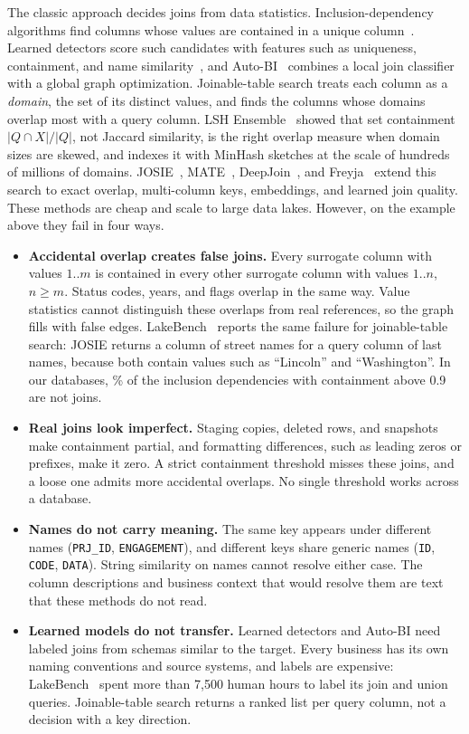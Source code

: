 The classic approach decides joins from data statistics.
Inclusion-dependency algorithms find columns whose values are contained in a unique column~\cite{Tschirschnitz17}.
Learned detectors score such candidates with features such as uniqueness, containment, and name similarity~\cite{Rostin09,ZhangHOPS10,HoPF}, and Auto-BI~\cite{AutoBI} combines a local join classifier with a global graph optimization.
Joinable-table search treats each column as a \emph{domain}, the set of its distinct values, and finds the columns whose domains overlap most with a query column.
LSH Ensemble~\cite{DBLP:journals/pvldb/ZhuNPM16} showed that set containment $|Q \cap X|/|Q|$, not Jaccard similarity, is the right overlap measure when domain sizes are skewed, and indexes it with MinHash sketches at the scale of hundreds of millions of domains.
JOSIE~\cite{DBLP:conf/sigmod/ZhuDNM19}, MATE~\cite{MATE}, DeepJoin~\cite{2023_dong_deepjoin}, and Freyja~\cite{Freyja} extend this search to exact overlap, multi-column keys, embeddings, and learned join quality.
These methods are cheap and scale to large data lakes.
However, on the example above they fail in four ways.
\begin{itemize}[leftmargin=*]
\item \textbf{Accidental overlap creates false joins.} Every surrogate column with values $1..m$ is contained in every other surrogate column with values $1..n$, $n \geq m$. Status codes, years, and flags overlap in the same way. Value statistics cannot distinguish these overlaps from real references, so the graph fills with false edges. LakeBench~\cite{LakeBench} reports the same failure for joinable-table search: JOSIE returns a column of street names for a query column of last names, because both contain values such as ``Lincoln'' and ``Washington''. In our databases, \% of the inclusion dependencies with containment above 0.9 are not joins.
\item \textbf{Real joins look imperfect.} Staging copies, deleted rows, and snapshots make containment partial, and formatting differences, such as leading zeros or prefixes, make it zero. A strict containment threshold misses these joins, and a loose one admits more accidental overlaps. No single threshold works across a database.
\item \textbf{Names do not carry meaning.} The same key appears under different names (\texttt{PRJ\_ID}, \texttt{ENGAGEMENT}), and different keys share generic names (\texttt{ID}, \texttt{CODE}, \texttt{DATA}). String similarity on names cannot resolve either case. The column descriptions and business context that would resolve them are text that these methods do not read.
\item \textbf{Learned models do not transfer.} Learned detectors and Auto-BI need labeled joins from schemas similar to the target. Every business has its own naming conventions and source systems, and labels are expensive: LakeBench~\cite{LakeBench} spent more than 7,500 human hours to label its join and union queries. Joinable-table search returns a ranked list per query column, not a decision with a key direction.
\end{itemize}


